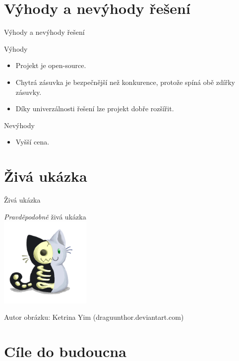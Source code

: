 \documentclass[11pt]{beamer}
\begin{document}
\section{Výhody a nevýhody řešení}

\begin{frame}{Výhody a nevýhody řešení}
  \begin{exampleblock}{Výhody}
    \begin{itemize}
      \item Projekt je open-source.
      \item Chytrá zásuvka je bezpečnější než konkurence, protože spíná obě zdířky zásuvky.
      \item Díky univerzálnosti řešení lze projekt dobře rozšířit.
    \end{itemize}
  \end{exampleblock}
  \begin{alertblock}{Nevýhody}
    \begin{itemize}
      \item Vyšší cena.
    \end{itemize}
  \end{alertblock}
\end{frame}

\section{Živá ukázka}
\begin{frame}{Živá ukázka}
  \begin{center}
    \huge{\textit{Pravděpodobně} živá ukázka} \\
    \vspace{8mm}
    \includegraphics[width = 0.33\textwidth]{../img/kocka.png}
    \vspace{8mm}
  \end{center}
  \small{Autor obrázku: Ketrina Yim (draguunthor.deviantart.com)}
\end{frame}

\section{Cíle do budoucna}
\end{document}
